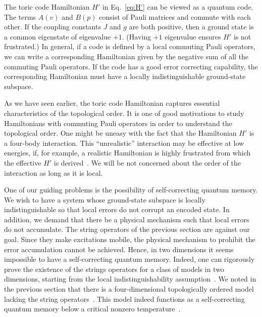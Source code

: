 The toric code Hamiltonian $H'$ in Eq.~\eqref{eq:H'} can be viewed as a quantum code. The terms $A(v)$ and $B(p)$ consist of Pauli matrices and commute with each other. If the coupling constants $J$ and $g$ are both positive, then a ground state is a common eigenstate of eigenvalue $+1$. (Having $+1$ eigenvalue ensures $H'$ is not frustrated.) 
In general, if a code is defined by a local commuting Pauli operators, we can write a corresponding Hamiltonian given by the negative sum of all the commuting Pauli operators. If the code has a good error correcting capability, the corresponding Hamiltonian must have a locally indistinguishable ground-state subspace. 

As we have seen earlier, the toric code Hamiltonian captures essential characteristics of the topological order. It is one of good motivations to study Hamiltonians with commuting Pauli operators in order to understand the topological order. One might be uneasy with the fact that the Hamiltonian $H'$ is a four-body interaction. This ``unrealistic'' interaction may be effective at low energies, if, for example, a realistic Hamiltonian is highly frustrated from which the effective $H'$ is derived~\cite{ReadSachdev1991LargeN, Kitaev2006Anyons}. We will be not concerned about the order of the interaction as long as it is local.

One of our guiding problems is the possibility of self-correcting quantum memory. We wish to have a system whose ground-state subspace is locally indistinguishable so that local errors do not corrupt an encoded state. In addition, we demand that there be a physical mechanism such that local errors do not accumulate. The string operators of the previous section are against our goal. Since they make excitations mobile, the physical mechanism to prohibit the error accumulation cannot be achieved. Hence, in two dimensions it seems impossible to have a self-correcting quantum memory. Indeed, one can rigorously prove the existence of the strings operators for a class of models in two dimensions, starting from the local indistinguishability assumption~\cite{BravyiTerhal2009no-go, HaahPreskill2012tradeoff, LandoncardinalPoulin2013nogo}. We noted in the previous section that there is a four-dimensional topologically ordered model lacking the string operators~\cite{DennisKitaevLandahlEtAl2002Topological}. This model indeed functions as a self-correcting quantum memory below a critical nonzero temperature~\cite{AlickiHorodeckiHorodeckiEtAl2010thermal}.


